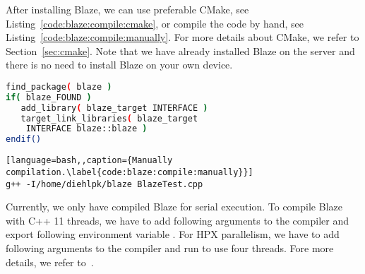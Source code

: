 \documentclass[11pt,fleqn]{book} %
\begin{document}
After installing Blaze, we can use preferable CMake, see Listing~\ref{code:blaze:compile:cmake}, or compile the code by hand, see Listing~\ref{code:blaze:compile:manually}. For more details about CMake, we refer to Section~\ref{sec:cmake}. Note that we have already installed Blaze on the server and there is no need to install Blaze on your own device.

\begin{minipage}{\linewidth}
\begin{minipage}{0.45\linewidth}
\begin{lstlisting}[language=bash,caption={Compilation using CMake.\label{code:blaze:compile:cmake}}]
find_package( blaze )
if( blaze_FOUND )
   add_library( blaze_target INTERFACE )
   target_link_libraries( blaze_target 
   	INTERFACE blaze::blaze )
endif()
\end{lstlisting}
\end{minipage}
\hfill
\begin{minipage}{0.45\linewidth}
\begin{lstlisting}[language=bash,,caption={Manually compilation.\label{code:blaze:compile:manually}}]
g++ -I/home/diehlpk/blaze BlazeTest.cpp
\end{lstlisting}
\end{minipage}
\end{minipage}

Currently, we only have compiled Blaze for serial execution. To compile Blaze with C++ 11 threads, we have to add following arguments  to the compiler and export following environment variable . For HPX parallelism, we have to add following arguments  to the compiler and run  to use four threads. Fore more details, we refer to~.

\end{document}
